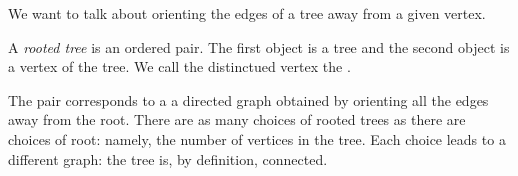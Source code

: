 

We want to talk about
orienting the edges of
a tree away from a given
vertex.


A \emph{rooted tree}
is an ordered pair. The first
object is a tree and the second
object is a vertex of the tree.
We call the
distinctued vertex the .

The pair corresponds to a
a directed graph obtained by
orienting all the edges away
from the root.
There are as many choices of
rooted trees as there are choices
of root: namely, the number of
vertices in the tree.
Each choice leads to a different
graph: the tree is, by definition,
connected.
